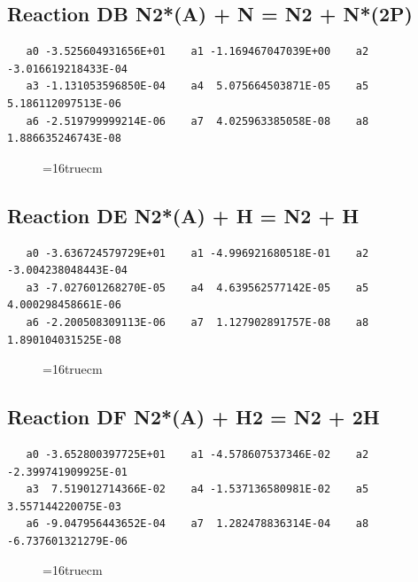 \documentclass[12pt,dvipdfm]{article}
\begin{document}
\subsection{
Reaction DB N2*(A) + N  = N2 + N*(2P)}
\begin{small}\begin{verbatim}
   a0 -3.525604931656E+01    a1 -1.169467047039E+00    a2 -3.016619218433E-04
   a3 -1.131053596850E-04    a4  5.075664503871E-05    a5  5.186112097513E-06
   a6 -2.519799999214E-06    a7  4.025963385058E-08    a8  1.886635246743E-08
   \end{verbatim}\end{small}
\begin{figure}[h!] \label{n2rates}
\epsfxsize=16truecm
\end{figure}
\newpage

\subsection{
Reaction DE N2*(A) + H = N2 + H}
\begin{small}\begin{verbatim}
   a0 -3.636724579729E+01    a1 -4.996921680518E-01    a2 -3.004238048443E-04
   a3 -7.027601268270E-05    a4  4.639562577142E-05    a5  4.000298458661E-06
   a6 -2.200508309113E-06    a7  1.127902891757E-08    a8  1.890104031525E-08
   \end{verbatim}\end{small}
\begin{figure}[h!] \label{n2rates}
\epsfxsize=16truecm
\end{figure}
\newpage

\subsection{
Reaction DF N2*(A) + H2  = N2 + 2H}
\begin{small}\begin{verbatim}
   a0 -3.652800397725E+01    a1 -4.578607537346E-02    a2 -2.399741909925E-01
   a3  7.519012714366E-02    a4 -1.537136580981E-02    a5  3.557144220075E-03
   a6 -9.047956443652E-04    a7  1.282478836314E-04    a8 -6.737601321279E-06
   \end{verbatim}\end{small}
\begin{figure}[h!] \label{n2rates}
\epsfxsize=16truecm
\end{figure}
\newpage
\end{document}
